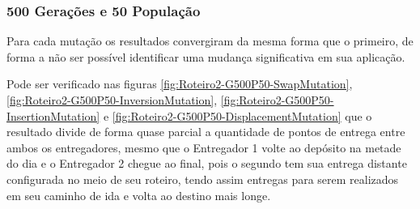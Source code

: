 \subsubsection{500 Gerações e 50 População}

Para cada mutação os resultados convergiram da mesma forma que o primeiro, de forma a não ser possível identificar uma mudança significativa em sua aplicação.

Pode ser verificado nas figuras \ref{fig:Roteiro2-G500P50-SwapMutation}, \ref{fig:Roteiro2-G500P50-InversionMutation}, \ref{fig:Roteiro2-G500P50-InsertionMutation} e \ref{fig:Roteiro2-G500P50-DisplacementMutation} que o resultado divide de forma quase parcial a quantidade de pontos de entrega entre ambos os entregadores,  mesmo que o Entregador 1 volte ao depósito na metade do dia e o Entregador 2 chegue ao final, pois o segundo tem sua entrega distante configurada no meio de seu roteiro, tendo assim entregas para serem realizados em seu caminho de ida e volta ao destino mais longe.

